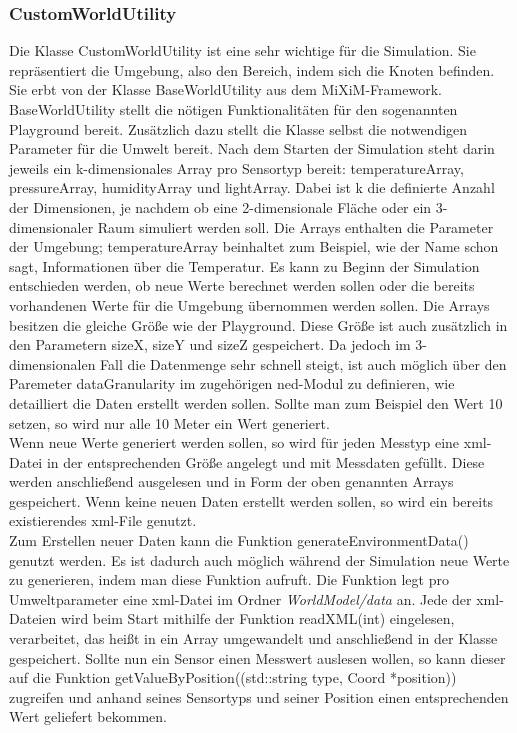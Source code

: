 \subsubsection{CustomWorldUtility}

Die Klasse CustomWorldUtility ist eine sehr wichtige für die Simulation. Sie repräsentiert die Umgebung, also den Bereich, indem sich die Knoten befinden. Sie erbt von der Klasse BaseWorldUtility aus dem MiXiM-Framework. BaseWorldUtility stellt die nötigen Funktionalitäten für den sogenannten Playground bereit. \newline
Zusätzlich dazu stellt die Klasse selbst die notwendigen Parameter für die Umwelt bereit. Nach dem Starten der Simulation steht darin jeweils ein k-dimensionales Array pro Sensortyp bereit: temperatureArray, pressureArray, humidityArray und lightArray. Dabei ist k die definierte Anzahl der Dimensionen, je nachdem ob eine 2-dimensionale Fläche oder ein 3-dimensionaler Raum simuliert werden soll. Die Arrays enthalten die Parameter der Umgebung; temperatureArray beinhaltet zum Beispiel, wie der Name schon sagt, Informationen über die Temperatur. \newline
Es kann zu Beginn der Simulation entschieden werden, ob neue Werte berechnet werden sollen oder die bereits vorhandenen Werte für die Umgebung übernommen werden sollen. Die Arrays besitzen die gleiche Größe wie der Playground. Diese Größe ist auch zusätzlich in den Parametern sizeX, sizeY und sizeZ gespeichert. \newline
Da jedoch im 3-dimensionalen Fall die Datenmenge sehr schnell steigt, ist auch möglich über den Paremeter dataGranularity im zugehörigen ned-Modul zu definieren, wie detailliert die Daten erstellt werden sollen. Sollte man zum Beispiel den Wert 10 setzen, so wird nur alle 10 Meter ein Wert generiert.\\
Wenn neue Werte generiert werden sollen, so wird für jeden Messtyp eine xml-Datei in der entsprechenden Größe angelegt und mit Messdaten gefüllt. Diese werden anschließend ausgelesen und in Form der oben genannten Arrays gespeichert. Wenn keine neuen Daten erstellt werden sollen, so wird ein bereits existierendes xml-File genutzt.\\
Zum Erstellen neuer Daten kann die Funktion generateEnvironmentData() genutzt werden. Es ist dadurch auch möglich während der Simulation neue Werte zu generieren, indem man diese Funktion aufruft. Die Funktion legt pro Umweltparameter eine xml-Datei im Ordner \textit{WorldModel/data} an. Jede der xml-Dateien wird beim Start mithilfe der Funktion readXML(int) eingelesen, verarbeitet, das heißt in ein Array umgewandelt und anschließend in der Klasse gespeichert. \newline
Sollte nun ein Sensor einen Messwert auslesen wollen, so kann dieser auf die Funktion getValueByPosition((std::string type, Coord *position)) zugreifen und anhand seines Sensortyps und seiner Position einen entsprechenden Wert geliefert bekommen.

